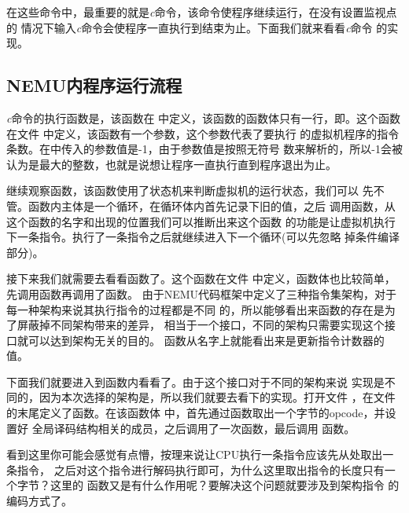 在这些命令中，最重要的就是\emph{c}命令，该命令使程序继续运行，在没有设置监视点的
情况下输入\emph{c}命令会使程序一直执行到结束为止。下面我们就来看看\emph{c}命令
的实现。

\subsection{NEMU内程序运行流程}
\emph{c}命令的执行函数是，该函数在
中定义，该函数的函数体只有一行，即。这个函数在文件
中定义，该函数有一个参数，这个参数代表了要执行
的虚拟机程序的指令条数。在中传入的参数值是-1，由于参数值是按照无符号
数来解析的，所以-1会被认为是最大的整数，也就是说想让程序一直执行直到程序退出为止。


继续观察函数，该函数使用了状态机来判断虚拟机的运行状态，我们可以
先不管。函数内主体是一个循环，在循环体内首先记录下旧的\pc 值，之后
调用函数，从这个函数的名字和出现的位置我们可以推断出来这个函数
的功能是让虚拟机执行下一条指令。执行了一条指令之后就继续进入下一个循环(可以先忽略
掉条件编译部分)。

接下来我们就需要去看看函数了。这个函数在文件
中定义，函数体也比较简单，先调用函数再调用了函数。
由于NEMU代码框架中定义了三种指令集架构，对于每一种架构来说其执行指令的过程都是不同
的，所以能够看出来函数的存在是为了屏蔽掉不同架构带来的差异，
相当于一个接口，不同的架构只需要实现这个接口就可以达到架构无关的目的。
函数从名字上就能看出来是更新指令计数器\pc 的值。

下面我们就要进入到函数内看看了。由于这个接口对于不同的架构来说
实现是不同的，因为本次选择的架构是\arch，所以我们就要去看\arch 下的实现。打开文件
，在文件的末尾定义了函数。在该函数体
中，首先通过函数取出一个字节的opcode，并设置好
全局译码结构相关的成员，之后调用了一次函数，最后调用
函数。

看到这里你可能会感觉有点懵，按理来说让CPU执行一条指令应该先从\pc 处取出一条指令，
之后对这个指令进行解码执行即可，为什么这里取出指令的长度只有一个字节？这里的
函数又是有什么作用呢？要解决这个问题就要涉及到\arch 架构指令
的编码方式了。

